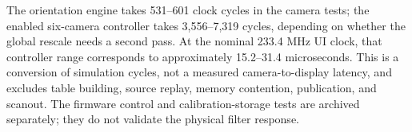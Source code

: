 The orientation engine takes 531--601 clock cycles in the camera tests; the
enabled six-camera controller takes 3,556--7,319 cycles, depending on whether
the global rescale needs a second pass. At the nominal 233.4 MHz UI clock,
that controller range corresponds to approximately 15.2--31.4 microseconds.
This is a conversion of simulation cycles, not a measured camera-to-display
latency, and excludes table building, source replay, memory contention,
publication, and scanout. The firmware control and calibration-storage tests
are archived separately; they do not validate the physical filter response.
